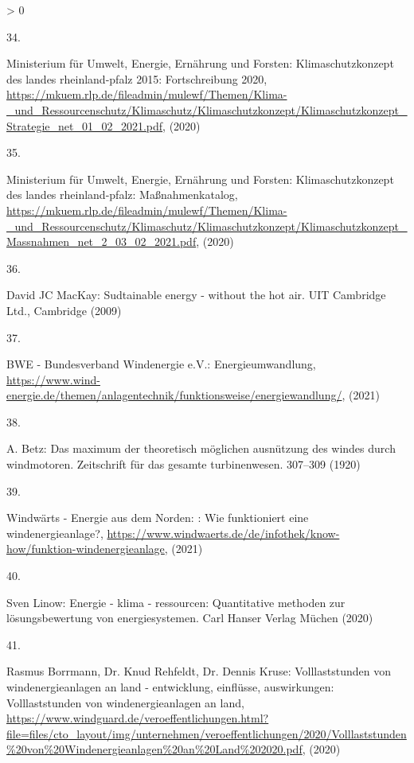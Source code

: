 \documentclass[a4paper,11pt]{article}
\newlength{\cslhangindent}
\newlength{\csllabelwidth}
\newenvironment{CSLReferences}[3] %
 {%
  \setlength{\parindent}{0pt}
  \ifodd #1 \everypar{\setlength{\hangindent}{\cslhangindent}}\ignorespaces\fi
  \ifnum #2 > 0
  \setlength{\parskip}{#2\baselineskip}
  \fi
 }%
 {}
\newcommand{\CSLLeftMargin}[1]{\parbox[t]{\maxof{\widthof{#1}}{\csllabelwidth}}{#1}}
\newcommand{\CSLRightInline}[1]{\parbox[t]{\linewidth}{#1}}
\begin{document}
\begin{CSLReferences}{0}{0}
\leavevmode\hypertarget{ref-MinisteriumfurUmweltEnergieErnahrungundForsten.2020b}{}%
\CSLLeftMargin{34. }
\CSLRightInline{Ministerium für Umwelt, Energie, Ernährung und Forsten: Klimaschutzkonzept des landes rheinland-pfalz 2015: Fortschreibung 2020, \url{https://mkuem.rlp.de/fileadmin/mulewf/Themen/Klima-_und_Ressourcenschutz/Klimaschutz/Klimaschutzkonzept/Klimaschutzkonzept_Strategie_net_01_02_2021.pdf}, (2020)}

\leavevmode\hypertarget{ref-MinisteriumfurUmweltEnergieErnahrungundForsten.2020}{}%
\CSLLeftMargin{35. }
\CSLRightInline{Ministerium für Umwelt, Energie, Ernährung und Forsten: Klimaschutzkonzept des landes rheinland-pfalz: Ma{ß}nahmenkatalog, \url{https://mkuem.rlp.de/fileadmin/mulewf/Themen/Klima-_und_Ressourcenschutz/Klimaschutz/Klimaschutzkonzept/Klimaschutzkonzept_Massnahmen_net_2_03_02_2021.pdf}, (2020)}

\leavevmode\hypertarget{ref-DavidJCMacKay.2009}{}%
\CSLLeftMargin{36. }
\CSLRightInline{David JC MacKay: Sudtainable energy - without the hot air. {UIT Cambridge Ltd.}, Cambridge (2009)}

\leavevmode\hypertarget{ref-BWE.2021}{}%
\CSLLeftMargin{37. }
\CSLRightInline{BWE - Bundesverband Windenergie e.V.: Energieumwandlung, \url{https://www.wind-energie.de/themen/anlagentechnik/funktionsweise/energiewandlung/}, (2021)}

\leavevmode\hypertarget{ref-A.Betz.1920}{}%
\CSLLeftMargin{38. }
\CSLRightInline{A. Betz: Das maximum der theoretisch m{ö}glichen ausn{ü}tzung des windes durch windmotoren. Zeitschrift f{ü}r das gesamte turbinenwesen. 307--309 (1920)}

\leavevmode\hypertarget{ref-WindwartsEnergieausdemNorden.2021}{}%
\CSLLeftMargin{39. }
\CSLRightInline{Windwärts - Energie aus dem Norden: : Wie funktioniert eine windenergieanlage?, \url{https://www.windwaerts.de/de/infothek/know-how/funktion-windenergieanlage}, (2021)}

\leavevmode\hypertarget{ref-SvenLinow.2020}{}%
\CSLLeftMargin{40. }
\CSLRightInline{Sven Linow: Energie - klima - ressourcen: Quantitative methoden zur l{ö}sungsbewertung von energiesystemen. {Carl Hanser Verlag M{ü}chen} (2020)}

\leavevmode\hypertarget{ref-RasmusBorrmannDr.KnudRehfeldtDr.DennisKruse.2020}{}%
\CSLLeftMargin{41. }
\CSLRightInline{Rasmus Borrmann, Dr. Knud Rehfeldt, Dr. Dennis Kruse: Volllaststunden von windenergieanlagen an land - entwicklung, einfl{ü}sse, auswirkungen: Volllaststunden von windenergieanlagen an land, \url{https://www.windguard.de/veroeffentlichungen.html?file=files/cto_layout/img/unternehmen/veroeffentlichungen/2020/Volllaststunden\%20von\%20Windenergieanlagen\%20an\%20Land\%202020.pdf}, (2020)}


\end{CSLReferences}
\end{document}
